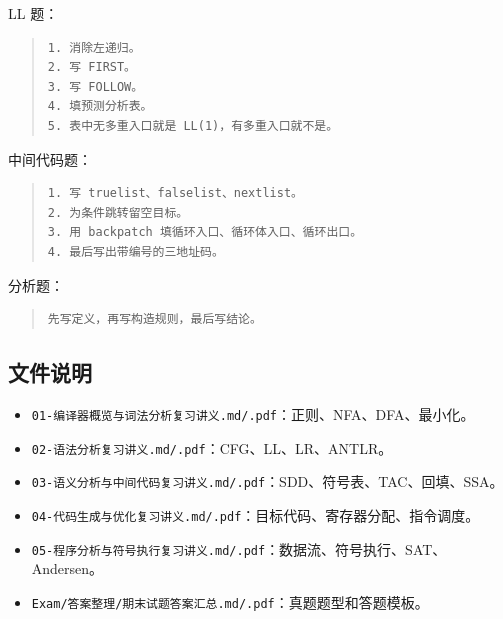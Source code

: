 \documentclass[UTF8,zihao=-4]{ctexart}
\begin{document}
LL 题：


\begin{quote}
\footnotesize
\begin{verbatim}
1. 消除左递归。
2. 写 FIRST。
3. 写 FOLLOW。
4. 填预测分析表。
5. 表中无多重入口就是 LL(1)，有多重入口就不是。
\end{verbatim}
\end{quote}


中间代码题：


\begin{quote}
\footnotesize
\begin{verbatim}
1. 写 truelist、falselist、nextlist。
2. 为条件跳转留空目标。
3. 用 backpatch 填循环入口、循环体入口、循环出口。
4. 最后写出带编号的三地址码。
\end{verbatim}
\end{quote}


分析题：


\begin{quote}
\footnotesize
\begin{verbatim}
先写定义，再写构造规则，最后写结论。
\end{verbatim}
\end{quote}


\subsection{文件说明}


\begin{itemize}
\item \texttt{01-编译器概览与词法分析复习讲义.md/.pdf}：正则、NFA、DFA、最小化。
\item \texttt{02-语法分析复习讲义.md/.pdf}：CFG、LL、LR、ANTLR。
\item \texttt{03-语义分析与中间代码复习讲义.md/.pdf}：SDD、符号表、TAC、回填、SSA。
\item \texttt{04-代码生成与优化复习讲义.md/.pdf}：目标代码、寄存器分配、指令调度。
\item \texttt{05-程序分析与符号执行复习讲义.md/.pdf}：数据流、符号执行、SAT、Andersen。
\item \texttt{Exam/答案整理/期末试题答案汇总.md/.pdf}：真题题型和答题模板。
\end{itemize}
\end{document}
